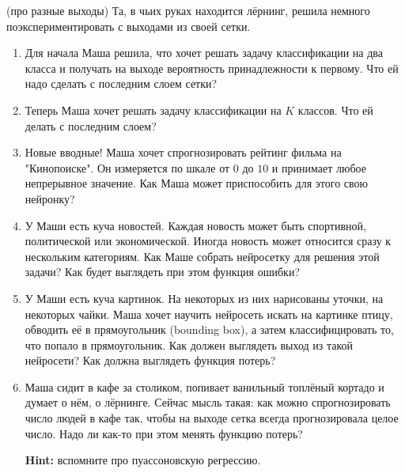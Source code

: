 \begin{problem}{(про разные выходы)}
Та, в чьих руках находится лёрнинг, решила немного поэкспериментировать с выходами из своей сетки. 

\begin{enumerate}
	\item  Для начала Маша решила, что хочет решать задачу классификации на два класса и получать на выходе вероятность принадлежности к первому. Что ей надо сделать с последним слоем сетки? 
	
	\item  Теперь Маша хочет решать задачу классификации на $K$ классов. Что ей делать с последним слоем? 
	
	\item  Новые вводные! Маша хочет спрогнозировать рейтинг фильма на "Кинопоиске". Он измеряется по шкале от $0$ до $10$ и принимает любое непрерывное значение. Как Маша может приспособить для этого свою нейронку? 
	
	\item У Маши есть куча новостей. Каждая новость может быть спортивной, политической или экономической. Иногда новость может относится сразу к нескольким категориям. Как Маше собрать нейросетку для решения этой задачи?  Как будет выглядеть при этом функция ошибки? 
	
	\item  У Маши есть куча картинок. На некоторых из них нарисованы уточки, на некоторых чайки. Маша хочет научить нейросеть искать на картинке птицу, обводить её в прямоугольник (bounding box), а затем классифицировать то, что попало в прямоугольник. Как должен выглядеть выход из такой нейросети? Как должна выглядеть функция потерь? 
	
	\item  Маша сидит в кафе за столиком, попивает ванильный топлёный кортадо и думает о нём, о лёрнинге.  Сейчас мысль такая: как можно спрогнозировать число людей в кафе так, чтобы на выходе сетка всегда прогнозировала целое число. Надо ли как-то при этом менять функцию потерь? 
	
	\textbf{Hint:} вспомните про пуассоновскую регрессию.
\end{enumerate}
\end{problem}


